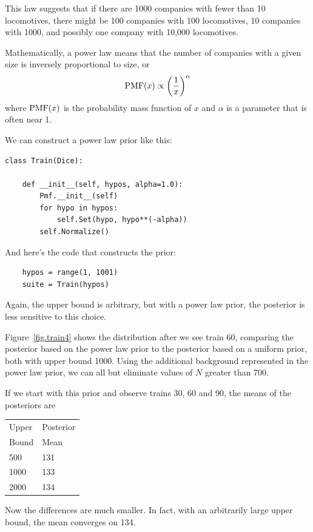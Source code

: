 \documentclass[12pt]{book}
\begin{document}
This law suggests that if there are 1000 companies with fewer than
10 locomotives, there might be 100 companies with 100 locomotives,
10 companies with 1000, and possibly one company with 10,000 locomotives.

Mathematically, a power law means that the number of companies
with a given size is inversely proportional to size, or
%
\[ \mathrm{PMF}(x) \propto \left( \frac{1}{x} \right)^{\alpha}   \]
%
where $\mathrm{PMF}(x)$ is the probability mass function of $x$ and $\alpha$ is
a parameter that is often near 1.

We can construct a power law prior like this:

\begin{verbatim}
class Train(Dice):

    def __init__(self, hypos, alpha=1.0):
        Pmf.__init__(self)
        for hypo in hypos:
            self.Set(hypo, hypo**(-alpha))
        self.Normalize()
\end{verbatim}

And here's the code that constructs the prior:

\begin{verbatim}
    hypos = range(1, 1001)
    suite = Train(hypos)
\end{verbatim}

Again, the upper bound is arbitrary, but with a power law
prior, the posterior is less sensitive to this choice.

Figure~\ref{fig.train4} shows the distribution after
we see train 60, comparing the posterior based on the power
law prior to the posterior based on a uniform prior, both
with upper bound 1000.  Using the additional background
represented in the power law prior, we can all but eliminate
values of $N$ greater than 700.

If we start with this prior and observe trains 30, 60 and 90,
the means of the posteriors are

  \begin{tabular}{|l|l|}
  \hline
  Upper & Posterior \\
  Bound & Mean \\
  \hline
  500 & 131 \\
  1000 & 133 \\
  2000 & 134 \\
  \hline
  \end{tabular}

Now the differences are much smaller.  In fact,
with an arbitrarily large upper bound, the mean converges on 134.
\end{document}
